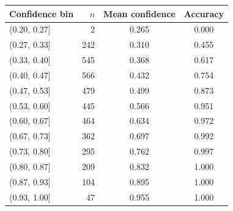 \begin{tabular}{lrcc}
\toprule
Confidence bin & $n$ & Mean confidence & Accuracy \\
\midrule
(0.20, 0.27] & 2 & 0.265 & 0.000 \\
(0.27, 0.33] & 242 & 0.310 & 0.455 \\
(0.33, 0.40] & 545 & 0.368 & 0.617 \\
(0.40, 0.47] & 566 & 0.432 & 0.754 \\
(0.47, 0.53] & 479 & 0.499 & 0.873 \\
(0.53, 0.60] & 445 & 0.566 & 0.951 \\
(0.60, 0.67] & 464 & 0.634 & 0.972 \\
(0.67, 0.73] & 362 & 0.697 & 0.992 \\
(0.73, 0.80] & 295 & 0.762 & 0.997 \\
(0.80, 0.87] & 209 & 0.832 & 1.000 \\
(0.87, 0.93] & 104 & 0.895 & 1.000 \\
(0.93, 1.00] & 47 & 0.955 & 1.000 \\
\bottomrule
\end{tabular}
